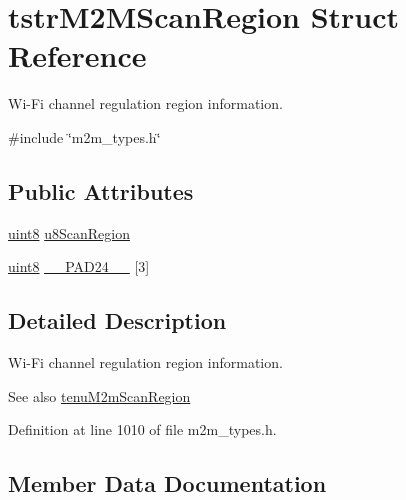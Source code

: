 \hypertarget{structtstrM2MScanRegion}{}\section{tstr\+M2\+M\+Scan\+Region Struct Reference}
\label{structtstrM2MScanRegion}


Wi-\/\+Fi channel regulation region information.  




{\ttfamily \#include \char`\"{}m2m\+\_\+types.\+h\char`\"{}}

\subsection*{Public Attributes}
\begin{DoxyCompactItemize}
\item 
\hyperlink{group__DataT_ga4df709a77647e870bbf1d955b8edc9a6}{uint8} \hyperlink{structtstrM2MScanRegion_a0fa84955213be6c6bf2602b743ec315f}{u8\+Scan\+Region}
\item 
\hyperlink{group__DataT_ga4df709a77647e870bbf1d955b8edc9a6}{uint8} \hyperlink{structtstrM2MScanRegion_a59149c0c01c7e7e7720f888ece268e5c}{\+\_\+\+\_\+\+P\+A\+D24\+\_\+\+\_\+} \mbox{[}3\mbox{]}
\end{DoxyCompactItemize}


\subsection{Detailed Description}
Wi-\/\+Fi channel regulation region information. 

\begin{DoxySeeAlso}{See also}
\hyperlink{group__WlanEnums_ga7ffc49398ba597866801fd1e847a4183}{tenu\+M2m\+Scan\+Region} 
\end{DoxySeeAlso}


Definition at line 1010 of file m2m\+\_\+types.\+h.



\subsection{Member Data Documentation}
\mbox{\label{structtstrM2MScanRegion_a59149c0c01c7e7e7720f888ece268e5c}} 
